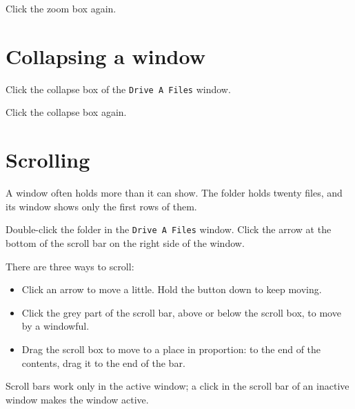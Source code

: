 \begin{TaskSteps}[resume]
\Step Click the zoom box again.
\end{TaskSteps}

\section{Collapsing a window}
\begin{TaskSteps}
\Step Click the collapse box of the \texttt{Drive A Files} window.
\end{TaskSteps}


\begin{TaskSteps}[resume]
\Step Click the collapse box again.
\end{TaskSteps}

\section{Scrolling}
A window often holds more than it can show.  The  folder holds
twenty files, and its window shows only the first rows of them.
\begin{TaskSteps}
\Step Double-click the  folder in the \texttt{Drive A Files}
window.
\Step Click the arrow at the bottom of the scroll bar on the right side of
the window.
\end{TaskSteps}


There are three ways to scroll:
\begin{itemize}
\item Click an arrow to move a little.  Hold the button down to keep
  moving.
\item Click the grey part of the scroll bar, above or below the scroll
  box, to move by a windowful.
\item Drag the scroll box to move to a place in proportion: to the end of
  the contents, drag it to the end of the bar.
\end{itemize}
Scroll bars work only in the active window; a click in the scroll bar of an
inactive window makes the window active.

